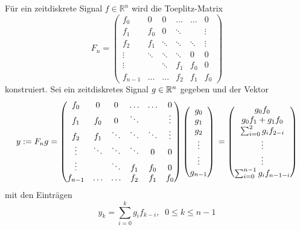 Für ein zeitdiskrete Signal $f \in \mathbb{R}^{n}$ wird die Toeplitz-Matrix 
\begin{equation*} 
    F_n=\begin{pmatrix}
        f_0 & 0 &0 &\ldots &\ldots &0 \\ 
        f_1 & f_0 &0 &\ddots & &\vdots \\
        f_2 & f_1 &\ddots &\ddots &\ddots &\vdots\\
        \vdots & \ddots &\ddots &\ddots &0 &0\\
        \vdots & &\ddots &f_1 &f_0 &0 \\
        f_{n-1} &\ldots &\ldots &f_{2} &f_{1} &f_0
    \end{pmatrix}
\end{equation*}
konstruiert. Sei ein zeitdiskretes Signal $g \in \mathbb{R}^{n}$ gegeben und der Vektor
\begin{equation*}
    y:=F_n g =\begin{pmatrix}
        f_0 & 0 &0 &\ldots &\ldots &0 \\ 
        f_1 & f_0 &0 &\ddots & &\vdots \\
        f_2 & f_1 &\ddots &\ddots &\ddots &\vdots\\
        \vdots & \ddots &\ddots &\ddots &0 &0\\
        \vdots & &\ddots &f_1 &f_0 &0 \\
        f_{n-1} &\ldots &\ldots &f_{2} &f_{1} &f_0
    \end{pmatrix}
    \begin{pmatrix}
        g_0 \\
        g_1 \\
        g_2 \\
        \vdots \\
        \vdots \\
        g_{n-1}
    \end{pmatrix} \\
    = \begin{pmatrix}
        g_0 f_0 \\
        g_0 f_1+ g_1 f_0 \\
        \sum_{i=0}^2 g_i f_{2-i}  \\
        \vdots \\
        \vdots \\
        \sum_{i=0}^{n-1} g_i f_{n-1-i} 
    \end{pmatrix}
\end{equation*}
mit den Einträgen 
\begin{equation*}
   y_k=\sum_{i=0}^k g_i f_{k-i}, \; \; 0 \leq k \leq n-1
\end{equation*}
